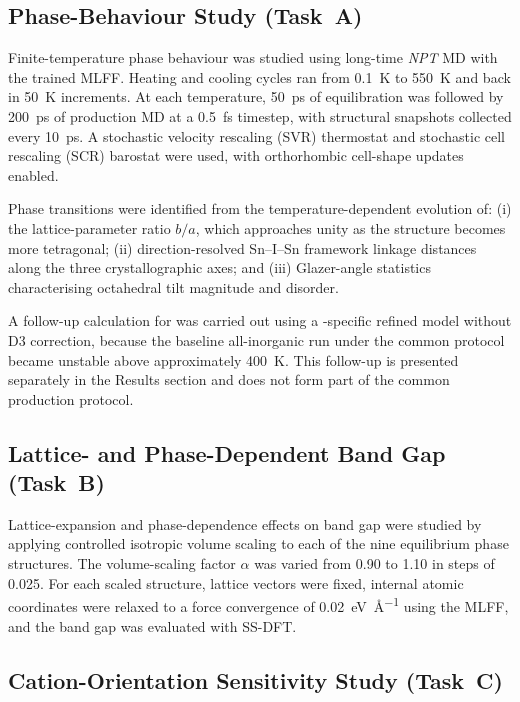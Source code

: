 \subsection{Phase-Behaviour Study (Task~A)}
\label{subsec:taskA}

Finite-temperature phase behaviour was studied using long-time
\textit{NPT} MD with the trained MLFF.
Heating and cooling cycles ran from \SI{0.1}{K} to \SI{550}{K}
and back in \SI{50}{K} increments.
At each temperature, \SI{50}{ps} of equilibration was followed by
\SI{200}{ps} of production MD at a \SI{0.5}{fs} timestep, with
structural snapshots collected every \SI{10}{ps}.
A stochastic velocity rescaling (SVR) thermostat and stochastic
cell rescaling (SCR) barostat were used, with orthorhombic
cell-shape updates enabled.

Phase transitions were identified from the temperature-dependent
evolution of:
(i) the lattice-parameter ratio $b/a$, which approaches unity as
the structure becomes more tetragonal;
(ii) direction-resolved Sn--I--Sn framework linkage distances along
the three crystallographic axes; and
(iii) Glazer-angle statistics characterising octahedral tilt
magnitude and disorder.

A follow-up calculation for \CsSnI{} was carried out using a
-specific refined model without D3 correction, because the
baseline all-inorganic run under the common protocol became unstable
above approximately \SI{400}{K}.
This follow-up is presented separately in the Results section and
does not form part of the common production protocol.

\subsection{Lattice- and Phase-Dependent Band Gap (Task~B)}
\label{subsec:taskB}

Lattice-expansion and phase-dependence effects on band gap were
studied by applying controlled isotropic volume scaling to each of
the nine equilibrium phase structures.
The volume-scaling factor $\alpha$ was varied from 0.90 to 1.10
in steps of 0.025.
For each scaled structure, lattice vectors were fixed, internal
atomic coordinates were relaxed to a force convergence of
\SI{0.02}{eV\per\angstrom} using the MLFF, and the band gap was
evaluated with SS-DFT.

\subsection{Cation-Orientation Sensitivity Study (Task~C)}
\label{subsec:taskC}

